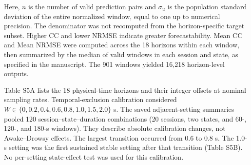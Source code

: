 Here, $n$ is the number of valid prediction pairs and $\sigma_u$ is the population standard deviation of the entire normalized window, equal to one up to numerical precision. The denominator was not recomputed from the horizon-specific target subset. Higher CC and lower NRMSE indicate greater forecastability. Mean CC and Mean NRMSE were computed across the 18 horizons within each window, then summarized by the median of valid windows in each session and state, as specified in the manuscript. The 901 windows yielded 16,218 horizon-level outputs.

Table S5A lists the 18 physical-time horizons and their integer offsets at nominal sampling rates. Temporal-exclusion calibration considered $W\in\{0,0.2,0.4,0.6,0.8,1.0,1.5,2.0\}$ s. The saved adjacent-setting summaries pooled 120 session--state--duration combinations (20 sessions, two states, and 60-, 120-, and 180-s windows). They describe absolute calibration changes, not Awake--Drowsy effects. The largest transition occurred from 0.6 to 0.8 s. The 1.0-s setting was the first sustained stable setting after that transition (Table S5B). No per-setting state-effect test was used for this calibration.

